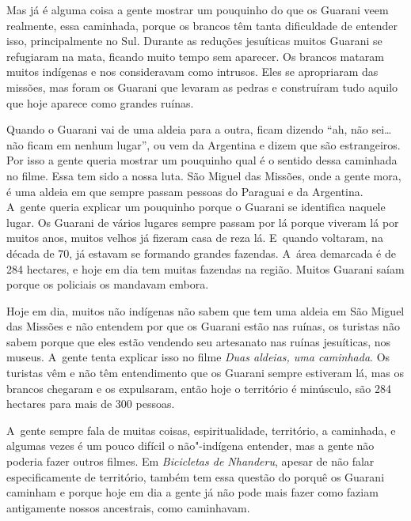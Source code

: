 Mas já é alguma coisa a gente mostrar um pouquinho do que os Guarani
veem realmente, essa caminhada, porque os brancos têm tanta dificuldade
de entender isso, principalmente no Sul. Durante as reduções jesuíticas
muitos Guarani se refugiaram na mata, ficando muito tempo sem
aparecer. Os brancos mataram muitos indígenas e nos consideravam como
intrusos. Eles se apropriaram das missões, mas foram os Guarani que
levaram as pedras e construíram tudo aquilo que hoje aparece como
grandes ruínas.

Quando o Guarani vai de uma aldeia para a outra, ficam dizendo ``ah, não
sei\ldots{} não ficam em nenhum lugar'', ou vem da Argentina e dizem que são
estrangeiros. Por isso a gente queria mostrar um pouquinho qual é o
sentido dessa caminhada no filme. Essa tem sido a nossa luta. São
Miguel das Missões, onde a gente mora, é uma aldeia em que sempre
passam pessoas do Paraguai e da Argentina. A~gente queria explicar um
pouquinho porque o Guarani se identifica naquele lugar. Os Guarani de
vários lugares sempre passam por lá porque viveram lá por muitos anos,
muitos velhos já fizeram casa de reza lá. E~quando voltaram, na década
de 70, já estavam se formando grandes fazendas. A~área demarcada é de
284 hectares, e hoje em dia tem muitas fazendas na região. Muitos
Guarani saíam porque os policiais os mandavam embora.

Hoje em dia, muitos não indígenas não sabem que tem uma aldeia em São
Miguel das Missões e não entendem por que os Guarani estão nas ruínas,
os turistas não sabem porque que eles estão vendendo seu artesanato nas
ruínas jesuíticas, nos museus. A~gente tenta explicar isso no filme
\emph{Duas aldeias, uma caminhada}. Os turistas vêm e não têm entendimento que
os Guarani sempre estiveram lá, mas os brancos chegaram e os
expulsaram, então hoje o território é minúsculo, são 284 hectares para
mais de 300 pessoas.

A~gente sempre fala de muitas coisas, espiritualidade, território, a
caminhada, e algumas vezes é um pouco difícil o não"-indígena entender,
mas a gente não poderia fazer outros filmes. Em \emph{Bicicletas de Nhanderu},
apesar de não falar especificamente de território, também tem essa
questão do porquê os Guarani caminham e porque hoje em dia a gente já
não pode mais fazer como faziam antigamente nossos ancestrais, como
caminhavam.

